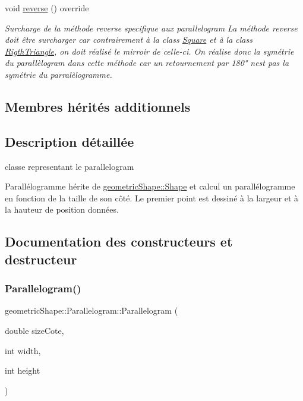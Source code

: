 \begin{DoxyCompactItemize}
\mbox{\label{classgeometric_shape_1_1_parallelogram_a7e21f9f5a2461973cf3cc3c14efb6e1a}} 
void \hyperlink{classgeometric_shape_1_1_parallelogram_a7e21f9f5a2461973cf3cc3c14efb6e1a}{reverse} () override
\begin{DoxyCompactList}\small\item\em Surcharge de la méthode reverse specifique aux parallelogram La méthode reverse doit être surcharger car contrairement à la class \hyperlink{classgeometric_shape_1_1_square}{Square} et à la class \hyperlink{classgeometric_shape_1_1_rigth_triangle}{Rigth\+Triangle}, on doit réalisé le mirroir de celle-\/ci. On réalise donc la symétrie du parallèlogram dans cette méthode car un retournement par 180° n\textquotesingle{}est pas la symétrie du parralèlogramme. \end{DoxyCompactList}\end{DoxyCompactItemize}
\subsection*{Membres hérités additionnels}


\subsection{Description détaillée}
classe representant le parallelogram 

Parallélogramme hérite de \hyperlink{classgeometric_shape_1_1_shape}{geometric\+Shape\+::\+Shape} et calcul un parallélogramme en fonction de la taille de son côté. Le premier point est dessiné à la largeur et à la hauteur de position données. 

\subsection{Documentation des constructeurs et destructeur}
\mbox{\label{classgeometric_shape_1_1_parallelogram_ad65826d9cb438059b6c96e1326ade523}} 
\subsubsection{\texorpdfstring{Parallelogram()}{Parallelogram()}\hspace{0.1cm}{\footnotesize\ttfamily [1/2]}}
{\footnotesize\ttfamily geometric\+Shape\+::\+Parallelogram\+::\+Parallelogram (\begin{DoxyParamCaption}\item[{double}]{size\+Cote,  }\item[{int}]{width,  }\item[{int}]{height }\end{DoxyParamCaption})}



